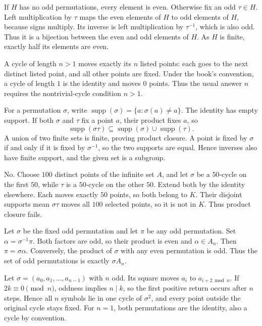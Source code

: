 If $H$ has no odd permutations, every element is even. Otherwise fix an odd $\tau\in H$. Left multiplication by $\tau$ maps the even elements of $H$ to odd elements of $H$, because signs multiply. Its inverse is left multiplication by $\tau^{-1}$, which is also odd. Thus it is a bijection between the even and odd elements of $H$. As $H$ is finite, exactly half its elements are even.

A cycle of length $n>1$ moves exactly its $n$ listed points: each goes to the next distinct listed point, and all other points are fixed. Under the book's convention, a cycle of length $1$ is the identity and moves $0$ points. Thus the usual answer $n$ requires the nontrivial-cycle condition $n>1$.

For a permutation $\sigma$, write $\operatorname{supp}(\sigma)=\{a:\sigma(a)\ne a\}$. The identity has empty support. If both $\sigma$ and $\tau$ fix a point $a$, their product fixes $a$, so
\[\operatorname{supp}(\sigma\tau)\subseteq\operatorname{supp}(\sigma)\cup\operatorname{supp}(\tau).\]
A union of two finite sets is finite, proving product closure. A point is fixed by $\sigma$ if and only if it is fixed by $\sigma^{-1}$, so the two supports are equal. Hence inverses also have finite support, and the given set is a subgroup.

No. Choose $100$ distinct points of the infinite set $A$, and let $\sigma$ be a $50$-cycle on the first $50$, while $\tau$ is a $50$-cycle on the other $50$. Extend both by the identity elsewhere. Each moves exactly $50$ points, so both belong to $K$. Their disjoint supports mean $\sigma\tau$ moves all $100$ selected points, so it is not in $K$. Thus product closure fails.

Let $\sigma$ be the fixed odd permutation and let $\pi$ be any odd permutation. Set $\alpha=\sigma^{-1}\pi$. Both factors are odd, so their product is even and $\alpha\in A_n$. Then $\pi=\sigma\alpha$. Conversely, the product of $\sigma$ with any even permutation is odd. Thus the set of odd permutations is exactly $\sigma A_n$.

Let $\sigma=(a_0,a_1,\ldots,a_{n-1})$ with $n$ odd. Its square moves $a_i$ to $a_{i+2\bmod n}$. If $2k\equiv0\pmod n$, oddness implies $n\mid k$, so the first positive return occurs after $n$ steps. Hence all $n$ symbols lie in one cycle of $\sigma^2$, and every point outside the original cycle stays fixed. For $n=1$, both permutations are the identity, also a cycle by convention.

